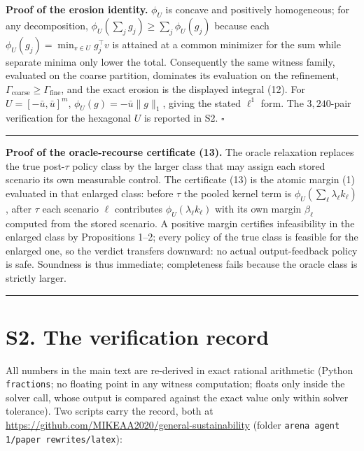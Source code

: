 \documentclass[10pt,article]{article}
\newcommand{\rulebar}{\begin{center}\rule{0.5\linewidth}{0.5pt}\end{center}}
\begin{document}
\textbf{Proof of the erosion identity.} \(\phi_U\) is concave and
positively homogeneous; for any decomposition,
\(\phi_U(\sum_j g_j) \ge \sum_j \phi_U(g_j)\) because each
\(\phi_U(g_j) = \min_{v \in U} g_j^\top v\) is attained at a common minimizer
for the sum while separate minima only lower the total. Consequently the same
witness family, evaluated on the coarse partition, dominates its evaluation
on the refinement, \(\Gamma_{\mathrm{coarse}} \ge \Gamma_{\mathrm{fine}}\),
and the exact erosion is the displayed integral (12). For
\(U = [-\bar u, \bar u]^m\), \(\phi_U(g) = -\bar u \|g\|_1\), giving the
stated \(\ell^1\) form. The \(3{,}240\)-pair verification for the hexagonal
\(U\) is reported in S2. \hfill\(\square\)
\rulebar

\textbf{Proof of the oracle-recourse certificate (13).} The oracle relaxation
replaces the true post-\(\tau\) policy class by the larger class that may
assign each stored scenario its own measurable control. The certificate (13)
is the atomic margin (1) evaluated in that enlarged class: before \(\tau\)
the pooled kernel term is \(\phi_U(\sum_\ell \lambda_\ell k_\ell)\), after
\(\tau\) each scenario \(\ell\) contributes \(\phi_U(\lambda_\ell k_\ell)\)
with its own margin \(\beta_\ell\) computed from the stored scenario. A
positive margin certifies infeasibility in the enlarged class by
Propositions 1--2; every policy of the true class is feasible for the
enlarged one, so the verdict transfers downward: no actual output-feedback
policy is safe. Soundness is thus immediate; completeness fails because the
oracle class is strictly larger.
\rulebar

\section*{S2. The verification record}

All numbers in the main text are re-derived in exact rational arithmetic
(Python \texttt{fractions}; no floating point in any witness computation;
floats only inside the solver call, whose output is compared against the
exact value only within solver tolerance). Two scripts carry the record, both
at \url{https://github.com/MIKEAA2020/general-sustainability} (folder
\texttt{arena agent 1/paper rewrites/latex}):
\end{document}
